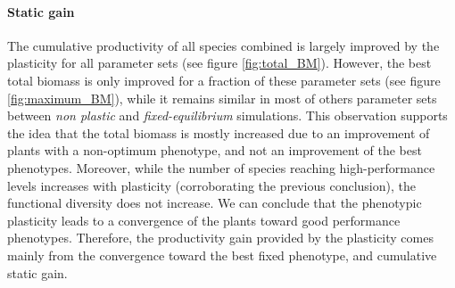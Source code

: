 %

\paragraph{Static gain}

The cumulative productivity of all species combined is largely improved by the plasticity for all parameter sets (see figure \ref{fig:total_BM}). However, the best total biomass is only improved for a fraction of these parameter sets (see figure \ref{fig:maximum_BM}), while it remains similar in most of others parameter sets between \textit{non plastic} and \textit{fixed-equilibrium} simulations. This observation supports the idea that the total biomass is mostly increased due to an improvement of plants with a non-optimum phenotype, and not an improvement of the best phenotypes. Moreover, while the number of species reaching high-performance levels increases with plasticity (corroborating the previous conclusion), the functional diversity does not increase. We can conclude that the phenotypic plasticity leads to a convergence of the plants toward good performance phenotypes. Therefore, the productivity gain provided by the plasticity comes mainly from the convergence toward the best fixed phenotype, and cumulative static gain.

